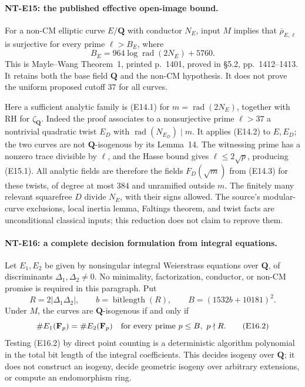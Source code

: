 \paragraph{NT-E15: the published effective open-image bound.}
For a non-CM elliptic curve $E/\mathbf Q$ with
conductor $N_E$, input $M$ implies that
$\overline\rho_{E,\ell}$ is surjective for every
prime $\ell>B_E$, where
\[
                 B_E=964\log\operatorname{rad}(2N_E)+5760.
 \tag{E15.1}
\]
This is Mayle--Wang Theorem~1, printed p.~1401,
proved in \S5.2, pp.~1412--1413.
It retains both the base field $\mathbf Q$ and
the non-CM hypothesis. It does not prove the
uniform proposed cutoff $37$ for all curves.

Here a sufficient analytic family is (E14.1) for
$m=\operatorname{rad}(2N_E)$, together with
RH for $\zeta_{\mathbf Q}$. Indeed the proof
associates to a nonsurjective prime $\ell>37$ a
nontrivial quadratic twist $E_D$ with
$\operatorname{rad}(N_{E_D})\mid m$.
It applies (E14.2) to $E,E_D$; the two curves
are not $\mathbf Q$-isogenous by its Lemma~14.
The witnessing prime has a nonzero trace divisible
by $\ell$, and the Hasse bound gives
$\ell\le2\sqrt p$, producing (E15.1).
All analytic fields are therefore the fields
$F_D(\sqrt m)$ from (E14.3) for these twists,
of degree at most $384$ and unramified outside $m$.
The finitely many relevant squarefree $D$ divide
$N_E$, with their signs allowed.
The source's modular-curve exclusions, local
inertia lemma, Faltings theorem, and twist facts
are unconditional classical inputs; this reduction
does not claim to reprove them.

\paragraph{NT-E16: a complete decision formulation from integral equations.}
Let $E_1,E_2$ be given by nonsingular integral
Weierstrass equations over $\mathbf Q$, of
discriminants $\Delta_1,\Delta_2\ne0$.
No minimality, factorization, conductor, or
non-CM promise is required in this paragraph.
Put
\[
 R=2|\Delta_1\Delta_2|,\qquad
 b=\operatorname{bitlength}(R),\qquad
                      B=(1532b+10181)^2.
 \tag{E16.1}
\]
Under $M$, the curves are $\mathbf Q$-isogenous
if and only if
\[
 \#E_1(\mathbf F_p)=\#E_2(\mathbf F_p)
                  \quad\hbox{for every prime }p\le B,\ p\nmid R.
 \tag{E16.2}
\]
Testing (E16.2) by direct point counting is a
deterministic algorithm polynomial in the total
bit length of the integral coefficients.
This decides isogeny over $\mathbf Q$; it does
not construct an isogeny, decide geometric
isogeny over arbitrary extensions, or compute an
endomorphism ring.

